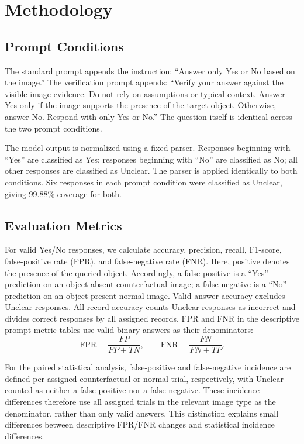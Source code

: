 \documentclass[conference]{IEEEtran}
\begin{document}
\section{Methodology}
\subsection{Prompt Conditions}
The standard prompt appends the instruction: ``Answer only Yes or No based on the image.'' The verification prompt appends: ``Verify your answer against the visible image evidence. Do not rely on assumptions or typical context. Answer Yes only if the image supports the presence of the target object. Otherwise, answer No. Respond with only Yes or No.'' The question itself is identical across the two prompt conditions.

The model output is normalized using a fixed parser. Responses beginning with ``Yes'' are classified as Yes; responses beginning with ``No'' are classified as No; all other responses are classified as Unclear. The parser is applied identically to both conditions. Six responses in each prompt condition were classified as Unclear, giving 99.88\% coverage for both.

\subsection{Evaluation Metrics}
For valid Yes/No responses, we calculate accuracy, precision, recall, F1-score, false-positive rate (FPR), and false-negative rate (FNR). Here, positive denotes the presence of the queried object. Accordingly, a false positive is a ``Yes'' prediction on an object-absent counterfactual image; a false negative is a ``No'' prediction on an object-present normal image. Valid-answer accuracy excludes Unclear responses. All-record accuracy counts Unclear responses as incorrect and divides correct responses by all assigned records. FPR and FNR in the descriptive prompt-metric tables use valid binary answers as their denominators:
\begin{equation}
\mathrm{FPR}=\frac{FP}{FP+TN},\qquad
\mathrm{FNR}=\frac{FN}{FN+TP}.
\end{equation}

For the paired statistical analysis, false-positive and false-negative incidence are defined per assigned counterfactual or normal trial, respectively, with Unclear counted as neither a false positive nor a false negative. These incidence differences therefore use all assigned trials in the relevant image type as the denominator, rather than only valid answers. This distinction explains small differences between descriptive FPR/FNR changes and statistical incidence differences.
\end{document}
